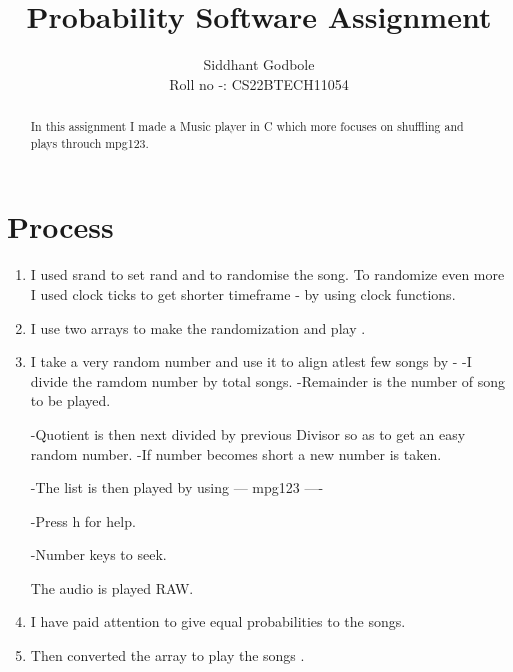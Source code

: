 \documentclass[journal,12pt,twocolumn]{IEEEtran}
\begin{document}
	\let\vec\mathbf

		
		\vspace{3cm}
		
		\title{
				Probability Software Assignment
		}
		\author{ Siddhant Godbole
			
			Roll no -: CS22BTECH11054
			
			
		}	

\maketitle


\bigskip


\begin{abstract}
	In this assignment I made a Music player in C which more focuses on shuffling and plays throuch mpg123.
\end{abstract}


\section*{Process}
\begin{enumerate}
	\item I used srand to set rand and to randomise the song.\newline
	To randomize even more I used clock ticks to get shorter timeframe -
			by using clock functions.
	
	\item I use two arrays to make the randomization and play .
		
	\item I take a very random number and use it to align atlest few songs by -\newline
		-I divide the ramdom number by total songs.\newline
		-Remainder is the number of song to be played.\newline
		
		-Quotient is then next divided by previous Divisor so as to get an easy random number.\newline
		-If number becomes short a new number is taken.\newline
		
		-The list is then played by using --- mpg123 ----\newline
		
		-Press h for help.\newline
		
		-Number keys to seek.\newline
			
		The audio is played RAW.
	\item I have paid attention to give equal probabilities to the songs.
	
	\item Then converted the array to play the songs .
\end{enumerate}
	
\end{document}
